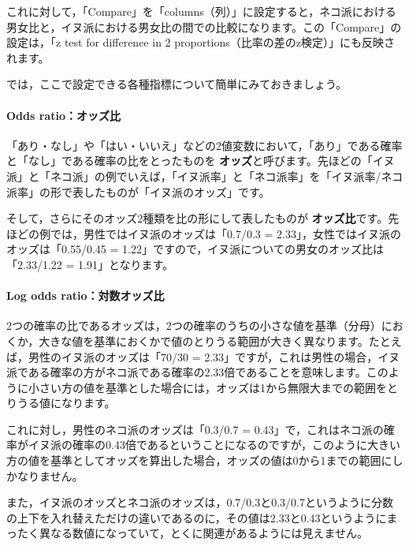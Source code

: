 \documentclass[
  12pt,
  a5jpaper,
  lualatex, ja=standard]{bxjsbook}
\renewcommand{\emph}[1]{\textbf{\color{emph} #1}}
\begin{document}
これに対して，「Compare」を「columns（列）」に設定すると，ネコ派における男女比と，イヌ派における男女比の間での比較になります。この「Compare」の設定は，「z test for difference in 2 proportions（比率の差のz検定）」にも反映されます。

では，ここで設定できる各種指標について簡単にみておきましょう。

\hypertarget{odds-ratioux30aaux30c3ux30baux6bd4-1}{%
\paragraph*{Odds ratio：オッズ比}\label{odds-ratioux30aaux30c3ux30baux6bd4-1}}

「あり・なし」や「はい・いいえ」などの2値変数において，「あり」である確率と「なし」である確率の比をとったものを\emph{オッズ}と呼びます。先ほどの「イヌ派」と「ネコ派」の例でいえば，「イヌ派率」と「ネコ派率」を「イヌ派率/ネコ派率」の形で表したものが「イヌ派のオッズ」です。

そして，さらにそのオッズ2種類を比の形にして表したものが\emph{オッズ比}です。先ほどの例では，男性ではイヌ派のオッズは「0.7/0.3 = 2.33」，女性ではイヌ派のオッズは「0.55/0.45 = 1.22」ですので，イヌ派についての男女のオッズ比は「2.33/1.22 = 1.91」となります。

\hypertarget{log-odds-ratioux5bfeux6570ux30aaux30c3ux30baux6bd4}{%
\paragraph*{Log odds ratio：対数オッズ比}\label{log-odds-ratioux5bfeux6570ux30aaux30c3ux30baux6bd4}}

2つの確率の比であるオッズは，2つの確率のうちの小さな値を基準（分母）におくか，大きな値を基準におくかで値のとりうる範囲が大きく異なります。たとえば，男性のイヌ派のオッズは「70/30 = 2.33」ですが，これは男性の場合，イヌ派である確率の方がネコ派である確率の2.33倍であることを意味します。このように小さい方の値を基準とした場合には，オッズは1から無限大までの範囲をとりうる値になります。

これに対し，男性のネコ派のオッズは「0.3/0.7 = 0.43」で，これはネコ派の確率がイヌ派の確率の0.43倍であるということになるのですが，このように大きい方の値を基準としてオッズを算出した場合，オッズの値は0から1までの範囲にしかなりません。

また，イヌ派のオッズとネコ派のオッズは，0.7/0.3と0.3/0.7というように分数の上下を入れ替えただけの違いであるのに，その値は2.33と0.43というようにまったく異なる数値になっていて，とくに関連があるようには見えません。
\end{document}
